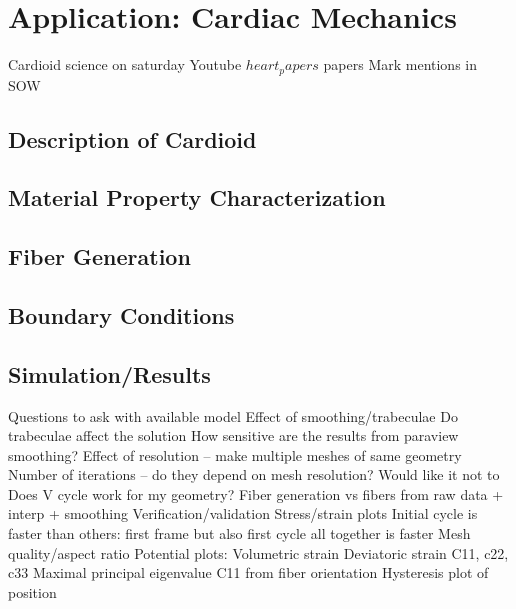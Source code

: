 \chapter{Application: Cardiac Mechanics}
%

Cardioid science on saturday Youtube
$heart_papers$
papers Mark mentions in SOW

\section{Description of Cardioid}
\label{Description of Cardioid}

\section{Material Property Characterization}
\label{Material Property Characterization}

\section{Fiber Generation}
\label{Simulation}

\section{Boundary Conditions}
\label{Boundary Conditions}

\section{Simulation/Results}
\label{Simulation/Results}


Questions to ask with available model
Effect of smoothing/trabeculae
Do trabeculae affect the solution
How sensitive are the results from paraview smoothing?
Effect of resolution – make multiple meshes of same geometry
Number of iterations – do they depend on mesh resolution? Would like it not to 
Does V cycle work for my geometry?
Fiber generation vs fibers from raw data + interp + smoothing
Verification/validation
Stress/strain plots
Initial cycle is faster than others: first frame but also first cycle all together is faster
Mesh quality/aspect ratio
Potential plots:	
Volumetric strain
Deviatoric strain
C11, c22, c33
Maximal principal eigenvalue
C11 from fiber orientation
Hysteresis plot of position

